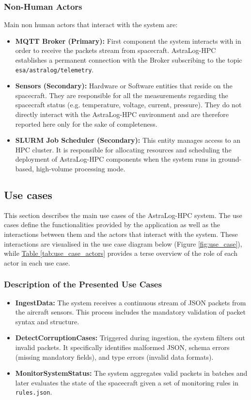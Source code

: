 \documentclass{article}
\newcommand{\tablerefer}[1]{%
    \hyperref[#1_top]{Table \ref*{#1}}%
}
\begin{document}
\subsubsection{Non-Human Actors}
Main non human actors that interact with the system are:
\begin{itemize}
    \item \textbf{MQTT Broker (Primary):} First component the system interacts with in order to receive the packets stream from spacecraft. AstraLog-HPC establishes a permanent connection with the Broker subscribing to the topic \verb|esa/astralog/telemetry|.
    \item \textbf{Sensors (Secondary):} Hardware or Software entities that reside on the spacecraft. They are responsible for all the measurements regarding the spacecraft status (e.g. temperature, voltage, current, pressure). They do not directly interact with the AstraLog-HPC environment and are therefore reported here only for the sake of completeness.  
    \item \textbf{SLURM Job Scheduler (Secondary):} This entity manages access to an HPC cluster. It is responsible for allocating resources and scheduling the deployment of AstraLog-HPC components when the system runs in ground-based, high-volume processing mode.
\end{itemize}
\subsection{Use cases}
This section describes the main use cases of the AstraLog-HPC system. The use cases define the functionalities provided by the application as well as the interactions between them and the actors that interact with the system.
These interactions are visualised in the use case diagram below (Figure \ref{fig:use_case}), while \tablerefer{tab:use_case_actors} provides a terse overview of the role of each actor in each use case.
\subsubsection*{Description of the Presented Use Cases}
\begin{itemize}
    \item \textbf{IngestData: }The system receives a continuous stream of JSON packets from the aircraft sensors. This process includes the mandatory validation of packet syntax and structure.
    \item \textbf{DetectCorruptionCases: }Triggered during ingestion, the system filters out invalid packets. It specifically identifies malformed JSON, schema errors (missing mandatory fields), and type errors (invalid data formats).
    \item \textbf{MonitorSystemStatus: }The system aggregates valid packets in batches and later evaluates the state of the spacecraft given a set of monitoring rules in \verb|rules.json|.
\end{itemize}
\end{document}

